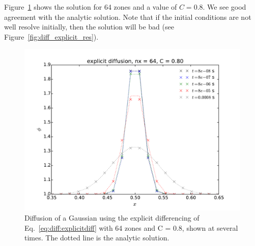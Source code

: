 Figure~\ref{fig:diff_explicit} shows the solution for 64 zones
and a value of $C = 0.8$.  We see good agreement with the
analytic solution.  Note that if the initial conditions are
not well resolve initially, then the solution will be bad
(see Figure~\ref{fig:diff_explicit_res}).


\begin{figure}
\centering
\includegraphics[width=\linewidth]{diff-explicit-64}
\caption[Explicit diffusion of a Gaussian]{\label{fig:diff_explicit}
Diffusion of a Gaussian using the explicit differencing of
Eq.~\ref{eq:diff:explicitdiff} with 64 zones and C = 0.8, shown at
several times.  The dotted line is the analytic
solution.  \\ }
\end{figure}


